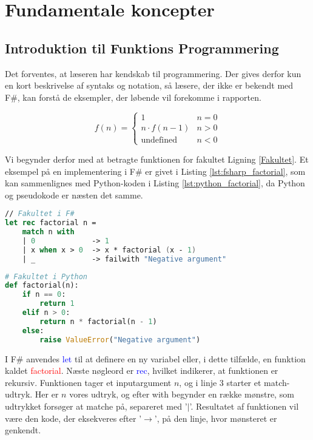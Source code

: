 
\section{Fundamentale koncepter}
\subsection{Introduktion til Funktions Programmering}
Det forventes, at læseren har kendskab til programmering. Der gives derfor kun en kort beskrivelse af syntaks og notation, så læsere, der ikke er bekendt med F\#, kan forstå de eksempler, der løbende vil forekomme i rapporten.

\begin{equation}
    \label{Fakultet}
    f(n) = \begin{cases} 
            1 &  n = 0  \\
            n \cdot f(n-1) & n > 0 \\
            \text{undefined} & n < 0 
           \end{cases}
\end{equation}

Vi begynder derfor med at betragte funktionen for fakultet Ligning \ref{Fakultet}. Et eksempel på en implementering i F\# er givet i Listing \ref{lst:fsharp_factorial}, som kan sammenlignes med Python-koden i Listing \ref{lst:python_factorial}, da Python og pseudokode er næsten det samme.



\begin{lstlisting}[language={FSharp}, label={lst:fsharp_factorial}, caption={Eksempel på Fakultet i F\#}]
// Fakultet i F#
let rec factorial n =
    match n with
    | 0             -> 1 
    | x when x > 0  -> x * factorial (x - 1)
    | _             -> failwith "Negative argument"
\end{lstlisting}

\begin{lstlisting}[language={Python}, label={lst:python_factorial}, caption={Eksempel på Fakultet i Python}]
# Fakultet i Python
def factorial(n):
    if n == 0:
        return 1
    elif n > 0:
        return n * factorial(n - 1)
    else:
        raise ValueError("Negative argument")
\end{lstlisting}

I F\# anvendes \textcolor{blue}{let} til at definere en ny variabel eller, i dette tilfælde, en funktion kaldet \textcolor{red}{factorial}. Næste nøgleord er \textcolor{blue}{rec}, hvilket indikerer, at funktionen er rekursiv. Funktionen tager et inputargument \(n\), og i linje 3 starter et match-udtryk. Her er \(n\) vores udtryk, og efter \textcolor{codepurple}{with} begynder en række mønstre, som udtrykket forsøger at matche på, separeret med '\(\vert\)'. Resultatet af funktionen vil være den kode, der eksekveres efter '\(\rightarrow\)', på den linje, hvor mønsteret er genkendt.
    
